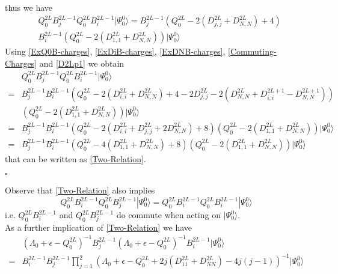 \documentclass[10pt]{article}
\numberwithin{equation}{section}
\numberwithin{equation}{subsection}
\begin{document}
\begin{itemize}
\begin{align}
\end{align} 
thus we have 
\begin{align}
 &Q_{0}^{2L}B_{j}^{2L-1}Q_{0}^{2L}B_{i}^{2L-1}|\Psi_{0}^{0}\rangle=B_{j}^{2L-1}\left(Q_{0}^{2L}-2(D_{j,j}^{2L}+D_{N,N}^{2L})+4\right)\nonumber\\&B_{i}^{2L-1}\left(Q_{0}^{2L}-2(D_{1,1}^{2L}+D_{N,N}^{2L})\right)|\Psi_{0}^{0}\rangle
\end{align}
Using \eqref{ExQ0B-charges}, \eqref{ExDiB-charges}, \eqref{ExDNB-charges}, \eqref{Commuting-Charges} and \eqref{D2Lp1} we obtain 
\begin{align}
	&Q_{0}^{2L}B_{j}^{2L-1}Q_{0}^{2L}B_{i}^{2L-1}|\Psi_{0}^{0}\rangle\nonumber\\=&B_{j}^{2L-1}B_{i}^{2L-1}\left(Q_{0}^{2L}-2(D_{i,i}^{2L}+D_{N,N}^{2L})+4-2D_{j,j}^{2L}-2(D_{N,N}^{2L}+D_{i,i}^{2L+1}-D_{N,N}^{2L+1})\right)\nonumber\\&\left(Q_{0}^{2L}-2(D_{1,1}^{2L}+D_{N,N}^{2L})\right)|\Psi_{0}^{0}\rangle\nonumber
	\\=&
	B_{j}^{2L-1}B_{i}^{2L-1}\left(Q_{0}^{2L}-2(D_{i,i}^{2L}+D_{j,j}^{2L}+2D_{N,N}^{2L})+8\right)\left(Q_{0}^{2L}-2(D_{1,1}^{2L}+D_{N,N}^{2L})\right)|\Psi_{0}^{0}\rangle\nonumber
	\\=&
	B_{j}^{2L-1}B_{i}^{2L-1}\left(Q_{0}^{2L}-4(D_{1,1}^{2L}+D_{N,N}^{2L})+8\right)\left(Q_{0}^{2L}-2(D_{1,1}^{2L}+D_{N,N}^{2L})\right)|\Psi_{0}^{0}\rangle
\end{align}
that can be written as \eqref{Two-Relation}. 
\end{itemize}
\begin{flushright}
	$\square$
\end{flushright}
Observe that \eqref{Two-Relation} also implies
\begin{equation}\label{Commutativity-Gained}
	Q_{0}^{2L}B_{i}^{2L-1}Q_{0}^{2L}B_{j}^{2L-1}|\Psi_{0}^{0}\rangle=Q_{0}^{2L}B_{i}^{2L-1}Q_{0}^{2L}B_{i}^{2L-1}|\Psi_{0}^{0}\rangle
\end{equation}
i.e. $Q_{0}^{2L}B_{i}^{2L-1}$ and $Q_{0}^{2L}B_{j}^{2L-1}$ do commute when acting on $|\Psi_{0}^{0}\rangle$.\\
As a further implication of \eqref{Two-Relation} we have
\begin{align}\label{Two-Points-m1}
	&\left(\Lambda_{0}+\epsilon-Q_{0}^{2L}\right)^{-1}B_{j}^{2L-1}\left(\Lambda_{0}+\epsilon-Q_{0}^{2L}\right)^{-1}B_{i}^{2L-1}|\Psi_{0}^{0}\rangle\nonumber
	\\=&
	B_{i}^{2L-1}B_{j}^{2L-1}\prod_{j=1}^{2}\left(\Lambda_{0}+\epsilon-Q_{0}^{2L}+2j(D_{11}^{2L}+D_{NN}^{2L})-4j(j-1)\right)^{-1}|\Psi_{0}^{0}\rangle
\end{align}
\end{document}
